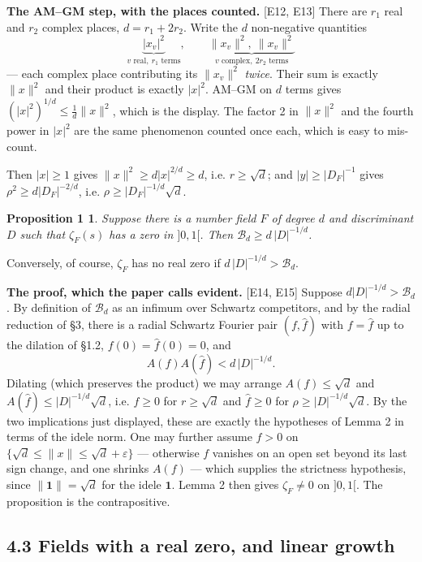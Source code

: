 \documentclass[11pt,reqno]{amsart}
\theoremstyle{plain}
\newtheorem*{propA}{Proposition 1}
\theoremstyle{definition}
\theoremstyle{remark}
\newcommand{\Bcal}{\mathcal{B}}
\newcommand{\fh}{\widehat{f}}
\newcommand{\Ledger}[1]{{\scriptsize\textsf{[#1]}}}
\begin{document}
\begin{expansion}
\textbf{The AM--GM step, with the places counted.} \Ledger{E12, E13} There are $r_1$
real and $r_2$ complex places, $d=r_1+2r_2$. Write the $d$ non-negative quantities
\[\underbrace{|x_v|^2}_{v\text{ real},\ r_1\text{ terms}},\qquad
  \underbrace{\|x_v\|^2,\ \|x_v\|^2}_{v\text{ complex},\ 2r_2\text{ terms}}\]
--- each complex place contributing its $\|x_v\|^2$ \emph{twice}. Their sum is
exactly $\|x\|^2$ and their product is exactly $|x|^2$. AM--GM on $d$ terms gives
$(|x|^2)^{1/d}\le\frac1d\|x\|^2$, which is the display. The factor 2 in
$\|x\|^2$ and the fourth power in $|x|^2$ are the same phenomenon counted once each,
which is easy to mis-count.

Then $|x|\ge1$ gives $\|x\|^2\ge d|x|^{2/d}\ge d$, i.e. $r\ge\sqrt d$; and
$|y|\ge|D_F|^{-1}$ gives $\rho^2\ge d|D_F|^{-2/d}$, i.e.
$\rho\ge|D_F|^{-1/d}\sqrt d$.
\end{expansion}

\begin{propA}
Suppose there is a number field $F$ of degree $d$ and discriminant $D$ such that
$\zeta_F(s)$ has a zero in $]0,1[$. Then $\Bcal_d\ge d\,|D|^{-1/d}$.
\end{propA}

Conversely, of course, $\zeta_F$ has no real zero if $d\,|D|^{-1/d}>\Bcal_d$.

\begin{filled}
\textbf{The proof, which the paper calls evident.} \Ledger{E14, E15} Suppose
$d|D|^{-1/d}>\Bcal_d$. By definition of $\Bcal_d$ as an infimum over Schwartz
competitors, and by the radial reduction of \S3, there is a radial Schwartz Fourier
pair $(f,\fh)$ with $f=\fh$ up to the dilation of \S1.2, $f(0)=\fh(0)=0$, and
\[A(f)A(\fh)<d\,|D|^{-1/d} .\]
Dilating (which preserves the product) we may arrange
$A(f)\le\sqrt d$ and $A(\fh)\le|D|^{-1/d}\sqrt d$, i.e. $f\ge0$ for $r\ge\sqrt d$ and
$\fh\ge0$ for $\rho\ge|D|^{-1/d}\sqrt d$. By the two implications just displayed,
these are exactly the hypotheses of Lemma 2 in terms of the idele norm. One may
further assume $f>0$ on $\{\sqrt d\le\|x\|\le\sqrt d+\varepsilon\}$ --- otherwise $f$
vanishes on an open set beyond its last sign change, and one shrinks $A(f)$ ---
which supplies the strictness hypothesis, since $\|\mathbf 1\|=\sqrt d$ for the idele
$\mathbf 1$. Lemma 2 then gives $\zeta_F\ne0$ on $]0,1[$. The proposition is the
contrapositive.
\end{filled}

\subsection*{4.3 Fields with a real zero, and linear growth}
\end{document}
